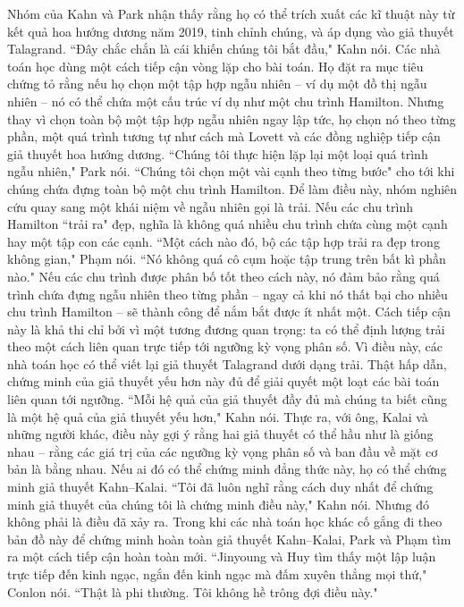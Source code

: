 \begin{multicols}{2}
	\vskip 0.1cm
	Nhóm của Kahn và Park nhận thấy rằng họ có thể trích xuất các kĩ thuật này từ kết quả hoa hướng dương năm 2019, tinh chỉnh chúng, và áp dụng vào giả thuyết Talagrand. ``Đây chắc chắn là cái khiến chúng tôi bắt đầu," Kahn nói.
	\vskip 0.1cm
	Các nhà toán học dùng một cách tiếp cận vòng lặp cho bài toán. Họ đặt ra mục tiêu chứng tỏ rằng nếu họ chọn một tập hợp ngẫu nhiên -- ví dụ một đồ thị ngẫu nhiên -- nó có thể chứa một cấu trúc ví dụ như một chu trình Hamilton. Nhưng thay vì chọn toàn bộ một tập hợp ngẫu nhiên ngay lập tức, họ chọn nó theo từng phần, một quá trình tương tự như cách mà Lovett và các đồng nghiệp tiếp cận giả thuyết hoa hướng dương. ``Chúng tôi thực hiện lặp lại một loại quá trình ngẫu nhiên," Park nói. ``Chúng tôi chọn một vài cạnh theo từng bước" cho tới khi chúng chứa đựng toàn bộ một chu trình Hamilton.
	\vskip 0.1cm
	Để làm điều này, nhóm nghiên cứu quay sang một khái niệm về ngẫu nhiên gọi là trải. Nếu các chu trình Hamilton ``trải ra" đẹp, nghĩa là không quá nhiều chu trình chứa cùng một cạnh hay một tập con các cạnh. ``Một cách nào đó, bộ các tập hợp trải ra đẹp trong không gian," Phạm nói. ``Nó không quá cô cụm hoặc tập trung trên bất kì phần nào." Nếu các chu trình được phân bố tốt theo cách này, nó đảm bảo rằng quá trình chứa đựng ngẫu nhiên theo từng phần -- ngay cả khi nó thất bại cho nhiều chu trình Hamilton -- sẽ thành công để nắm bắt được ít nhất một.
	\vskip 0.1cm
	Cách tiếp cận này là khả thi chỉ bởi vì một tương đương quan trọng: ta có thể định lượng trải theo một cách liên quan trực tiếp tới ngưỡng kỳ vọng phân số. Vì điều này, các nhà toán học có thể viết lại giả thuyết Talagrand dưới dạng trải.
	\vskip 0.1cm
	Thật hấp dẫn, chứng minh của giả thuyết yếu hơn này đủ để giải quyết một loạt các bài toán liên quan tới ngưỡng. ``Mỗi hệ quả của giả thuyết đầy đủ mà chúng ta biết cũng là một hệ quả của giả thuyết yếu hơn," Kahn nói. Thực ra, với ông, Kalai và những người khác, điều này gợi ý rằng hai giả thuyết có thể hầu như là giống nhau -- rằng các giá trị của các ngưỡng kỳ vọng phân số và ban đầu về mặt cơ bản là bằng nhau. Nếu ai đó có thể chứng minh đẳng thức này, họ có thể chứng minh giả thuyết Kahn--Kalai. ``Tôi đã luôn nghĩ rằng cách duy nhất để chứng minh giả thuyết của chúng tôi là chứng minh điều này," Kahn nói.
	\vskip 0.1cm
	Nhưng đó không phải là điều đã xảy ra. Trong khi các nhà toán học khác cố gắng đi theo bản đồ này để chứng minh hoàn toàn giả thuyết Kahn--Kalai, Park và Phạm tìm ra một cách tiếp cận hoàn toàn mới. ``Jinyoung và Huy tìm thấy một lập luận trực tiếp đến kinh ngạc, ngắn đến kinh ngạc mà đấm xuyên thẳng mọi thứ," Conlon nói. ``Thật là phi thường. Tôi không hề trông đợi điều này."

\end{multicols}
